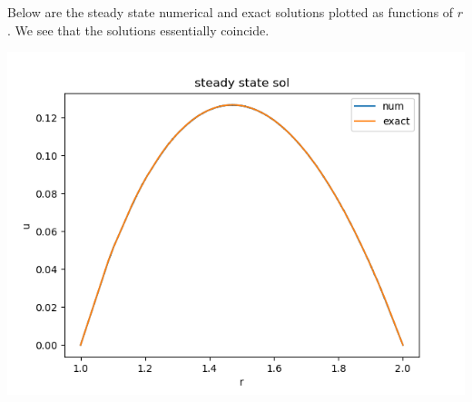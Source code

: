 \documentclass{article}
\begin{document}
\begin{enumerate}
\begin{enumerate}
	Below are the steady state numerical and exact solutions plotted as functions of $r$. We see that the solutions essentially coincide.
	
	\begin{center}
		\includegraphics[scale=.6]{hw10 steady state sol}
	\end{center}
	
	
\end{enumerate}



\end{enumerate}



	
\end{document}
